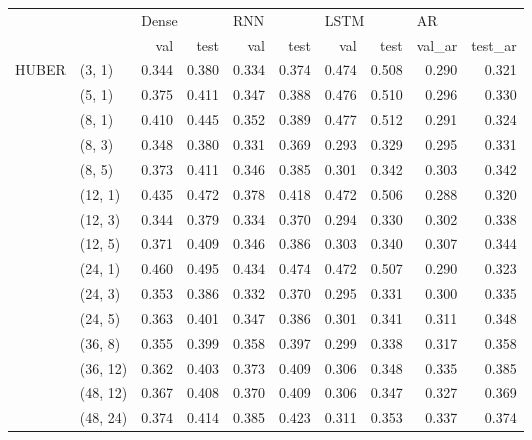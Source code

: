 
\begin{longtable}{ll|rr|rr|rr|rr}
\toprule
      &          & \multicolumn{2}{l}{Dense} & \multicolumn{2}{l}{RNN} & \multicolumn{2}{l}{LSTM} & \multicolumn{2}{l}{AR} \\
      &          & val & test & val & test & val & test & val\_ar & test\_ar \\
\midrule
\multirow{15}{*}{HUBER} & (3, 1) &     0.344 &      0.380 &   0.334 &    0.374 &    0.474 &     0.508 &  0.290 &   0.321 \\
      & (5, 1) &     0.375 &      0.411 &   0.347 &    0.388 &    0.476 &     0.510 &  0.296 &   0.330 \\
      & (8, 1) &     0.410 &      0.445 &   0.352 &    0.389 &    0.477 &     0.512 &  0.291 &   0.324 \\
      & (8, 3) &     0.348 &      0.380 &   0.331 &    0.369 &    0.293 &     0.329 &  0.295 &   0.331 \\
      & (8, 5) &     0.373 &      0.411 &   0.346 &    0.385 &    0.301 &     0.342 &  0.303 &   0.342 \\
      & (12, 1) &     0.435 &      0.472 &   0.378 &    0.418 &    0.472 &     0.506 &  0.288 &   0.320 \\
      & (12, 3) &     0.344 &      0.379 &   0.334 &    0.370 &    0.294 &     0.330 &  0.302 &   0.338 \\
      & (12, 5) &     0.371 &      0.409 &   0.346 &    0.386 &    0.303 &     0.340 &  0.307 &   0.344 \\
      & (24, 1) &     0.460 &      0.495 &   0.434 &    0.474 &    0.472 &     0.507 &  0.290 &   0.323 \\
      & (24, 3) &     0.353 &      0.386 &   0.332 &    0.370 &    0.295 &     0.331 &  0.300 &   0.335 \\
      & (24, 5) &     0.363 &      0.401 &   0.347 &    0.386 &    0.301 &     0.341 &  0.311 &   0.348 \\
      & (36, 8) &     0.355 &      0.399 &   0.358 &    0.397 &    0.299 &     0.338 &  0.317 &   0.358 \\
      & (36, 12) &     0.362 &      0.403 &   0.373 &    0.409 &    0.306 &     0.348 &  0.335 &   0.385 \\
      & (48, 12) &     0.367 &      0.408 &   0.370 &    0.409 &    0.306 &     0.347 &  0.327 &   0.369 \\
      & (48, 24) &     0.374 &      0.414 &   0.385 &    0.423 &    0.311 &     0.353 &  0.337 &   0.374 \\

\end{longtable}
